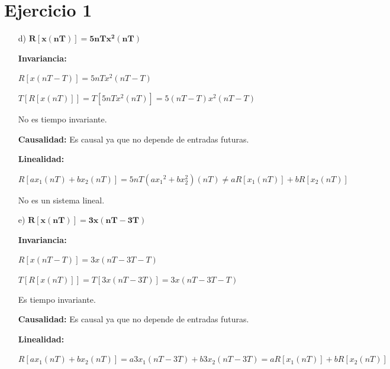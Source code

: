 








\section*{Ejercicio 1}
\begin{itemize}
	\item[d)] $\mathbf{R \left[ x \left( nT \right) \right] = 5nT x^2 \left( nT \right)}$ 
	
		\textbf{Invariancia:}
		
		$R \left[ x \left( nT - T \right) \right] = 5nT x^2 \left( nT -T \right)$ 
		
		$T \left[ R \left[ x \left( nT \right) \right] \right] = T \left[ 5nT x^2 \left( nT \right) \right] = 5(nT-T) x^2 \left( nT -T \right)$ 
		
		No es tiempo invariante.
		
		\textbf{Causalidad:} Es causal ya que no depende de entradas futuras.
		
		\textbf{Linealidad:}
		
		 $R \left[ ax_1 \left( nT \right) + bx_2 \left( nT \right) \right] = 5nT \left(a{x_{1}}^{2} + b {x_{2}^{2}}\right) \left( nT \right) \neq aR \left[ x_1 \left( nT \right) \right] + bR \left[ x_2 \left( nT \right) \right]$

		No es un sistema lineal.
		
	\item[e)] $\mathbf{R \left[ x \left( nT \right) \right] = 3x \left( nT - 3T\right)}$ 
	
		\textbf{Invariancia:}
		
		$R \left[ x \left( nT - T \right) \right] = 3x \left( nT - 3T -T \right)$ 
		
		$T \left[ R \left[ x \left( nT \right) \right] \right] = T \left[ 3x \left( nT - 3T \right) \right] = 3x \left( nT - 3T -T \right)$ 
		
		Es tiempo invariante.
		
		\textbf{Causalidad:} Es causal ya que no depende de entradas futuras.
		
		\textbf{Linealidad:}
		
		 $R \left[ ax_1 \left( nT \right) + bx_2 \left( nT \right) \right] = a3 x_{1} \left( nT - 3T \right) + b3 x_{2} \left( nT - 3T \right) = aR \left[ x_1 \left( nT \right) \right] + bR \left[ x_2 \left( nT \right) \right]$


\end{itemize}
